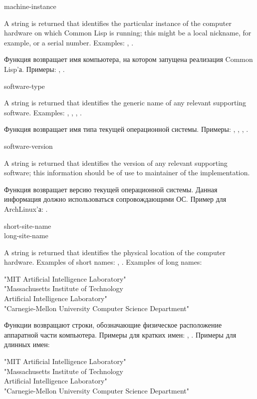 \begin{defun}[Function]
machine-instance 

A string is returned that identifies the particular
instance of the computer hardware on which Common Lisp is running;
this might be a local nickname, for example, or a serial number.
Examples: , .

Функция возвращает имя компьютера, на котором запущена реализация Common Lisp'а.
Примеры: , .
\end{defun}

\begin{defun}[Function]
software-type 

A string is returned that identifies the generic name of
any relevant supporting software.
Examples: , , , .

Функция возвращает имя типа текущей операционной системы.
Примеры: , , , .
\end{defun}

\begin{defun}[Function]
software-version 

A string is returned that identifies the version of
any relevant supporting software; this information
should be of use to maintainer of the implementation.

Функция возвращает версию текущей операционной системы. Данная информация должно
использоваться сопровождающими ОС.
Пример для ArchLinux'а: .
\end{defun}

\begin{defun}[Function]
short-site-name  \\
long-site-name 

A string is returned that identifies the physical location
of the computer hardware.
Examples of short names: , .
Examples of long names:
\begin{lisp}
"MIT Artificial Intelligence Laboratory" \\
"Massachusetts Institute of Technology \\
Artificial Intelligence Laboratory" \\
"Carnegie-Mellon University Computer Science Department"
\end{lisp}

Функции возвращают строки, обозначающие физическое расположение аппаратной части
компьютера.
Примеры для кратких имен: , .
Примеры для длинных имен:
\begin{lisp}
"MIT Artificial Intelligence Laboratory" \\
"Massachusetts Institute of Technology \\
Artificial Intelligence Laboratory" \\
"Carnegie-Mellon University Computer Science Department"
\end{lisp}
\end{defun}

